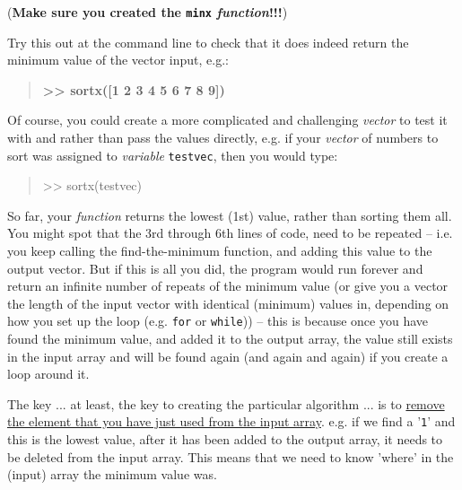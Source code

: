\documentclass{tufte-book} %
\newenvironment{docspec}{\begin{quotation}\ttfamily\parskip0pt\parindent0pt\ignorespaces}{\end{quotation}}
\newenvironment{docspecbold}{\begin{quotation}\ttfamily\bfseries\parskip0pt\parindent0pt\ignorespaces}{\end{quotation}}
\begin{document}
(\textbf{Make sure you created the \texttt{minx} \textit{function}!!!})

Try this out at the command line to check that it does indeed return the minimum value of the vector input, e.g.:
\vspace{-1mm}
\begin{docspecbold}
>> sortx([1 2 3 4 5 6 7 8 9])
\end{docspecbold}
\vspace{-1mm}
Of course, you could create a more complicated and challenging \textit{vector} to test it with and rather than pass the values directly, e.g. if your \textit{vector} of numbers to sort was assigned to \textit{variable} \texttt{testvec}, then you would type:
\vspace{-1mm}
\begin{docspec}
>> sortx(testvec)
\end{docspec}
\vspace{-1mm}

So far, your \textit{function} returns the lowest (1st) value, rather than sorting them all. You might spot that the 3rd through 6th lines of code, need to be repeated -- i.e. you keep calling the find-the-minimum function, and adding this value to the output vector. But if this is all you did, the program would run forever and return an infinite number of repeats of the minimum value (or give you a vector the length of the input vector with identical (minimum) values in, depending on how you set up the loop (e.g. \texttt{for} or \texttt{while})) -- this is because once you have found the minimum value, and added it to the output array, the value still exists in the input array and will be found again (and again and again) if you create a loop around it.

The key ... at least, the key to creating the particular algorithm ... is to \uline{remove the element that you have just used from the input array}. e.g. if we find a '\texttt{1}' and this is the lowest value, after it has been added to the output array, it needs to be deleted from the input array. This means that we need to know 'where' in the (input) array the minimum value was.
\end{document}
